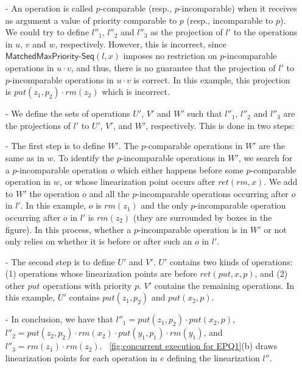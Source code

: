 \begin{itemize}
\setlength{\itemsep}{0.5pt}
\item[-] An operation is called $p$-comparable (resp., $p$-incomparable) when it receives as argument a value of priority comparable to $p$ (resp., incomparable to $p$). We could try to define $l''_1$, $l''_2$ and $l''_3$ as the projection of $l'$ to the operations in $u$, $v$ and $w$, respectively. However, this is incorrect, since $\mathsf{MatchedMaxPriority\text{-}Seq}(l,x)$ imposes no restriction on  $p$-incomparable operations in $u \cdot v$, and thus, there is no guarantee that the projection of $l'$ to $p$-incomparable operations in $u \cdot v$ is correct. In this example, this projection is $\textit{put}(z_1,p_2) \cdot \textit{rm}(z_2)$ which is incorrect.

\item[-] We define the sets of operations $U'$, $V'$ and $W'$ such that $l''_1$, $l''_2$ and $l''_3$ are the projections of $l'$ to $U'$, $V'$, and $W'$, respectively. This is done in two steps:

\item[-] The first step is to define $W'$. The $p$-comparable operations in $W'$ are the same as in $w$. To identify the $p$-incomparable operations in $W'$, we search for a $p$-incomparable operation $o$ which either happens before some $p$-comparable operation in $w$, or whose linearization point occurs after $\textit{ret}(\textit{rm},x)$. We add to $W'$ the operation $o$ and all the $p$-incomparable operations occurring after $o$ in $l'$. In this example, $o$ is $\textit{rm}(z_1)$ and the only $p$-incomparable operation occurring after $o$ in $l'$ is $\textit{rm}(z_2)$ (they are surrounded by boxes in the figure). In this process, whether a $p$-incomparable operation is in $W'$ or not only relies on whether it is before or after such an $o$ in $l'$.

\item[-] The second step is to define $U'$ and $V'$. $U'$ contains two kinds of operations: (1) operations whose linearization points are before $\textit{ret}(\textit{put},x,p)$, and (2) other $\textit{put}$ operations with priority $p$. $V'$ contains the remaining operations. In this example, $U'$ contains $\textit{put}(z_1,p_2)$ and $\textit{put}(x_2,p)$.

\item[-] In conclusion, we have that $l''_1 = \textit{put}(z_1,p_2) \cdot \textit{put}(x_2,p)$, $l''_2 = \textit{put}(z_2,p_2) \cdot \textit{rm}(x_2) \cdot \textit{put}(y_1,p_1) \cdot \textit{rm}(y_1)$, and $l''_3 = \textit{rm}(z_1) \cdot \textit{rm}(z_2)$. \figurename~\ref{fig:concurrent execution for EPQ1}(b) draws linearization points for each operation in $e$ defining the linearization $l''$.
\end{itemize}



